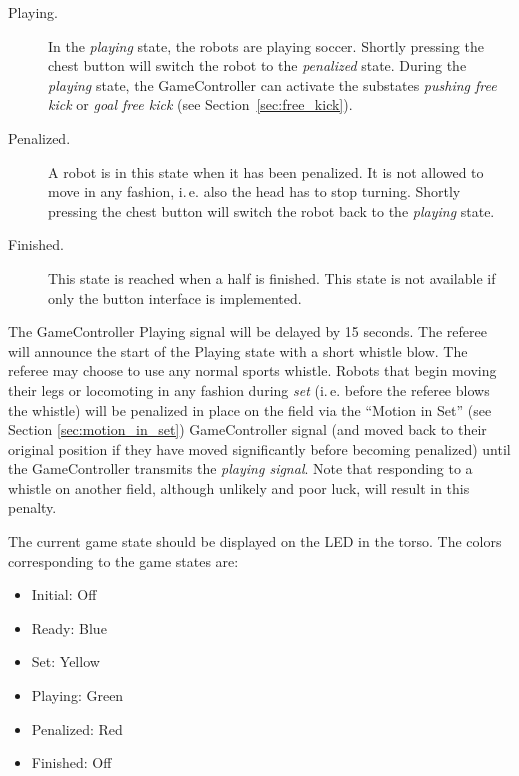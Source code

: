 \documentclass[12pt]{article}
\newcommand{\ie}{\mbox{i.\,e.}\xspace}
\begin{document}
\begin{description}
\item[Playing.] In the \emph{playing} state, the robots are playing soccer. Shortly pressing the chest button will switch the robot to the \emph{penalized} state. During the \emph{playing} state, the GameController can activate the substates \emph{pushing free kick} or \emph{goal free kick} (see Section~\ref{sec:free_kick}).

\item[Penalized.] A robot is in this state when it has been penalized. It is not allowed to move in any fashion, \ie also the head has to stop turning. Shortly pressing the chest button will switch the robot back to the \emph{playing} state.

\item[Finished.] This state is reached when a half is finished. This state is not available if only the button interface is implemented.

\end{description}

The GameController Playing signal will be delayed by 15 seconds.  The referee will announce the start of the Playing state with a short whistle blow.  The referee may choose to use any normal sports whistle.  Robots that begin moving their legs or locomoting in any fashion during \emph{set} (\ie before the referee blows the whistle) will be penalized in place on the field via the ``Motion in Set'' (see Section \ref{sec:motion_in_set}) GameController signal (and moved back to their original position if they have moved significantly before becoming penalized) until the GameController transmits the \emph{playing signal}.  Note that responding to a whistle on another field, although unlikely and poor luck, will result in this penalty.

The current game state should be displayed on the LED in the torso. The colors corresponding to the game states are:

\begin{itemize}

\item Initial: Off

\item Ready: Blue

\item Set: Yellow

\item Playing: Green

\item Penalized: Red

\item Finished: Off

\end{itemize}
\end{document}
